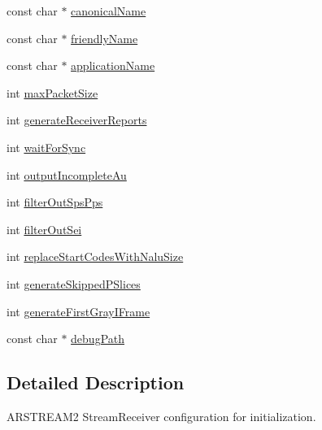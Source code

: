 \begin{DoxyCompactItemize}
\item 
const char $\ast$ \hyperlink{struct_a_r_s_t_r_e_a_m2___stream_receiver___config__t_a02cc5e7ee99bd0149ee79c6fcedec1ab}{canonical\+Name}
\item 
const char $\ast$ \hyperlink{struct_a_r_s_t_r_e_a_m2___stream_receiver___config__t_afc1329e99cfc032f49d1b9b3b2c35400}{friendly\+Name}
\item 
const char $\ast$ \hyperlink{struct_a_r_s_t_r_e_a_m2___stream_receiver___config__t_ad2d476376bafb71f7995a52bb2c50146}{application\+Name}
\item 
int \hyperlink{struct_a_r_s_t_r_e_a_m2___stream_receiver___config__t_abd9569dd137f25c4ebc4afced32fda48}{max\+Packet\+Size}
\item 
int \hyperlink{struct_a_r_s_t_r_e_a_m2___stream_receiver___config__t_a01d105be64764cd1eb52394bcae64daf}{generate\+Receiver\+Reports}
\item 
int \hyperlink{struct_a_r_s_t_r_e_a_m2___stream_receiver___config__t_aa7237c9022de4173df97d4e8f56579d7}{wait\+For\+Sync}
\item 
int \hyperlink{struct_a_r_s_t_r_e_a_m2___stream_receiver___config__t_a1a6a62577cca29b1c7464867b0125dff}{output\+Incomplete\+Au}
\item 
int \hyperlink{struct_a_r_s_t_r_e_a_m2___stream_receiver___config__t_a391adcd8dd1f5c62095b020466424816}{filter\+Out\+Sps\+Pps}
\item 
int \hyperlink{struct_a_r_s_t_r_e_a_m2___stream_receiver___config__t_adfb59506c571f11d194c8a0675a858c8}{filter\+Out\+Sei}
\item 
int \hyperlink{struct_a_r_s_t_r_e_a_m2___stream_receiver___config__t_aaecb0638e224440d69a17826500972d7}{replace\+Start\+Codes\+With\+Nalu\+Size}
\item 
int \hyperlink{struct_a_r_s_t_r_e_a_m2___stream_receiver___config__t_a5c755f04bd11970da40cccbc4dffa38d}{generate\+Skipped\+P\+Slices}
\item 
int \hyperlink{struct_a_r_s_t_r_e_a_m2___stream_receiver___config__t_a1482babd4b14d82b7381ee47ce0f9101}{generate\+First\+Gray\+I\+Frame}
\item 
const char $\ast$ \hyperlink{struct_a_r_s_t_r_e_a_m2___stream_receiver___config__t_a3a598e8532bdf21fbecadf3e18a0476c}{debug\+Path}
\end{DoxyCompactItemize}


\subsection{Detailed Description}
A\+R\+S\+T\+R\+E\+A\+M2 Stream\+Receiver configuration for initialization. 

